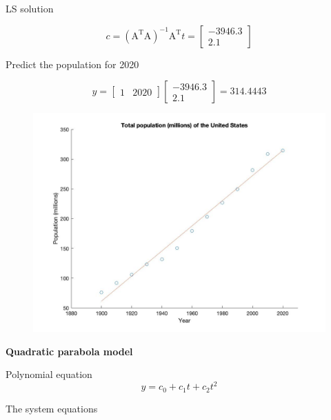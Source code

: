 \documentclass[conference]{IEEEtran}
\begin{document}
LS solution

\[ c = (\mathrm{A}^\mathrm{T}\mathrm{A})^{-1}\mathrm{A}^\mathrm{T}t = 
\begin{bmatrix}
-3946.3 \\
2.1
\end{bmatrix}\] 

Predict the population for 2020

\[ y = \begin{bmatrix}
1 & 2020 
\end{bmatrix}\begin{bmatrix}
-3946.3 \\
2.1
\end{bmatrix} = 314.4443\]

\begin{figure}[h!]
\centering
\includegraphics[width=0.6\linewidth]{images/img1.jpg}
\label{fig:img1}
\end{figure}

\textbf{Quadratic parabola model}

Polynomial equation 
\[ y = c_0 + c_1t  + c_2t^2\]

The system equations 
\end{document}
